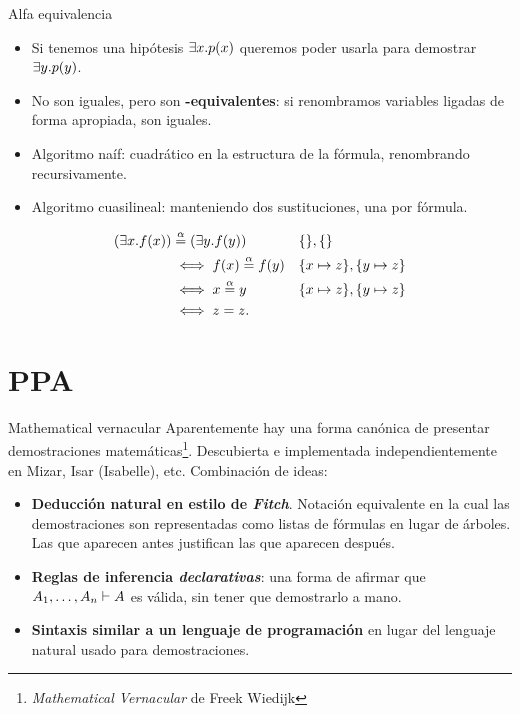 \documentclass[xcolor={dvipsnames},spanish]{beamer}
\begin{document}
\begin{frame}{Alfa equivalencia}
    \begin{itemize}    
        \item Si tenemos una hipótesis $\exists x . p(x)$ queremos poder
        usarla para demostrar $\exists y . p(y)$.
        \item No son iguales, pero son \textbf{\bm{$\alpha$}-equivalentes}: si
        renombramos variables ligadas de forma apropiada, son iguales.
        \item Algoritmo naíf: cuadrático en la estructura de la fórmula,
        renombrando recursivamente.
        \item Algoritmo cuasilineal: manteniendo dos sustituciones, una por
        fórmula.
    \end{itemize}
    \begin{example}
        \begin{align*}
            (\exists x . f(x)) &\overset{\alpha}{=} (\exists y . f(y))
            &&\{\}, \{\}
            \\
            &\iff f(x) \overset{\alpha}{=} f(y)
                &&\{x \mapsto z\}, \{y \mapsto z\}\\
            &\iff x \overset{\alpha}{=} y
                &&\{x \mapsto z\}, \{y \mapsto z\}\\
            &\iff z = z.
        \end{align*}        
    \end{example}
\end{frame}

\section{PPA}

\begin{frame}{Mathematical vernacular}
    Aparentemente hay una forma canónica de presentar demostraciones matemáticas\footnote{\textit{Mathematical
    Vernacular} de Freek Wiedijk}. Descubierta e implementada independientemente en Mizar,
    Isar (Isabelle), etc. Combinación de ideas:

    \begin{itemize}
        \item \textbf{Deducción natural en estilo de \textit{Fitch}}. Notación
        equivalente en la cual las demostraciones son
        representadas como listas de fórmulas en lugar de árboles. Las que
        aparecen antes justifican las que aparecen después.
        \item \textbf{Reglas de inferencia \textit{declarativas}}: una forma de afirmar
        que $A_1, \dots, A_n \vdash A$ es válida, sin
        tener que demostrarlo a mano.
        \item \textbf{Sintaxis similar a un lenguaje de programación} en lugar del
        lenguaje natural usado para demostraciones.
    \end{itemize}
\end{frame}
\end{document}
